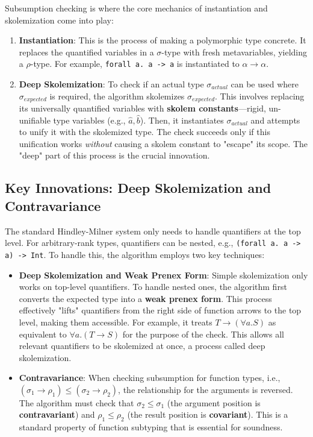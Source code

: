 Subsumption checking is where the core mechanics of instantiation and skolemization come into play:
\begin{enumerate}
    \item \textbf{Instantiation}: This is the process of making a polymorphic type concrete. It replaces the quantified variables in a $\sigma$-type with fresh metavariables, yielding a $\rho$-type. For example, \texttt{forall a. a -> a} is instantiated to $\alpha \to \alpha$.
    \item \textbf{Deep Skolemization}: To check if an actual type $\sigma_{actual}$ can be used where $\sigma_{expected}$ is required, the algorithm skolemizes $\sigma_{expected}$. This involves replacing its universally quantified variables with \textbf{skolem constants}---rigid, un-unifiable type variables (e.g., $\hat{a}, \hat{b}$). Then, it instantiates $\sigma_{actual}$ and attempts to unify it with the skolemized type. The check succeeds only if this unification works \textit{without} causing a skolem constant to "escape" its scope. The "deep" part of this process is the crucial innovation.
\end{enumerate}

\subsection{Key Innovations: Deep Skolemization and Contravariance}
The standard Hindley-Milner system only needs to handle quantifiers at the top level. For arbitrary-rank types, quantifiers can be nested, e.g., \texttt{(forall a. a -> a) -> Int}. To handle this, the algorithm employs two key techniques:
\begin{itemize}
    \item \textbf{Deep Skolemization and Weak Prenex Form}: Simple skolemization only works on top-level quantifiers. To handle nested ones, the algorithm first converts the expected type into a \textbf{weak prenex form}. This process effectively "lifts" quantifiers from the right side of function arrows to the top level, making them accessible. For example, it treats $T \to (\forall a. S)$ as equivalent to $\forall a. (T \to S)$ for the purpose of the check. This allows all relevant quantifiers to be skolemized at once, a process called deep skolemization.
    \item \textbf{Contravariance}: When checking subsumption for function types, i.e., $(\sigma_1 \to \rho_1) \le (\sigma_2 \to \rho_2)$, the relationship for the arguments is reversed. The algorithm must check that $\sigma_2 \le \sigma_1$ (the argument position is \textbf{contravariant}) and $\rho_1 \le \rho_2$ (the result position is \textbf{covariant}). This is a standard property of function subtyping that is essential for soundness.
\end{itemize}

